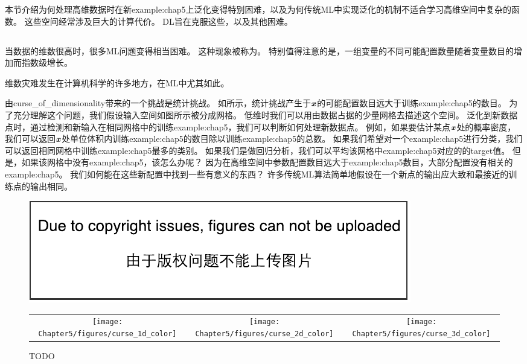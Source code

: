 本节介绍为何处理高维数据时在新\gls{example:chap5}上泛化变得特别困难，以及为何传统\gls{ML}中实现泛化的机制不适合学习高维空间中复杂的函数。
这些空间经常涉及巨大的计算代价。
\gls{DL}旨在克服这些，以及其他困难。

\subsection{}
\label{sec:the_curse_of_dimensionality}
当数据的维数很高时，很多\gls{ML}问题变得相当困难。
这种现象被称为。
特别值得注意的是，一组变量的不同可能配置数量随着变量数目的增加而指数级增长。

维数灾难发生在计算机科学的许多地方，在\gls{ML}中尤其如此。

由\gls{curse_of_dimensionality}带来的一个挑战是统计挑战。
如所示，统计挑战产生于$\boldsymbol{\mathit{x}}$的可能配置数目远大于训练\gls{example:chap5}的数目。
为了充分理解这个问题，我们假设输入空间如图所示被分成网格。
低维时我们可以用由数据占据的少量网格去描述这个空间。
泛化到新数据点时，通过检测和新输入在相同网格中的训练\gls{example:chap5}，我们可以判断如何处理新数据点。
例如，如果要估计某点$\boldsymbol{\mathit{x}}$处的概率密度，我们可以返回$\boldsymbol{\mathit{x}}$处单位体积内训练\gls{example:chap5}的数目除以训练\gls{example:chap5}的总数。
如果我们希望对一个\gls{example:chap5}进行分类，我们可以返回相同网格中训练\gls{example:chap5}最多的类别。
如果我们是做回归分析，我们可以平均该网格中\gls{example:chap5}对应的的\gls{target}值。
但是，如果该网格中没有\gls{example:chap5}，该怎么办呢？
因为在高维空间中参数配置数目远大于\gls{example:chap5}数目，大部分配置没有相关的\gls{example:chap5}。
我们如何能在这些新配置中找到一些有意义的东西？
许多传统\gls{ML}算法简单地假设在一个新点的输出应大致和最接近的训练点的输出相同。


\begin{figure}[!htb]
\ifOpenSource
\centerline{\includegraphics{figure.pdf}}
\else
\begin{tabular}{ccc}
    \texttt{[image: Chapter5/figures/curse\_1d\_color]} & \texttt{[image: Chapter5/figures/curse\_2d\_color]} & \texttt{[image: Chapter5/figures/curse\_3d\_color]}
\end{tabular}
\fi
\caption{TODO}
\label{fig:chap5_curse}
\end{figure}

